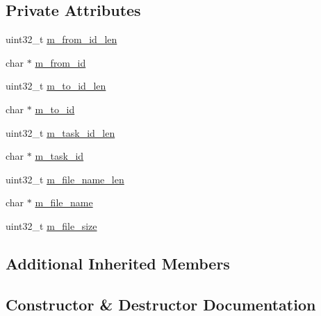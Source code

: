 \subsection*{Private Attributes}
\begin{DoxyCompactItemize}
\item 
uint32\+\_\+t \hyperlink{class_c_im_pdu_client_file_add_offline_req_a3fb49a99c470e955a3ea51f13f66b49b}{m\+\_\+from\+\_\+id\+\_\+len}
\item 
char $\ast$ \hyperlink{class_c_im_pdu_client_file_add_offline_req_a127d10089b9f3daa6bb7eac061203e4f}{m\+\_\+from\+\_\+id}
\item 
uint32\+\_\+t \hyperlink{class_c_im_pdu_client_file_add_offline_req_af9fc05c82fd007252c7ba53ba08a8a94}{m\+\_\+to\+\_\+id\+\_\+len}
\item 
char $\ast$ \hyperlink{class_c_im_pdu_client_file_add_offline_req_a57c210ecfdbfef4eb3912aeef27f31c2}{m\+\_\+to\+\_\+id}
\item 
uint32\+\_\+t \hyperlink{class_c_im_pdu_client_file_add_offline_req_af0b1969ae38d3e156ab37f3050029a6e}{m\+\_\+task\+\_\+id\+\_\+len}
\item 
char $\ast$ \hyperlink{class_c_im_pdu_client_file_add_offline_req_aac27f3f2e26f9f6a0d4aca16ce00c0d7}{m\+\_\+task\+\_\+id}
\item 
uint32\+\_\+t \hyperlink{class_c_im_pdu_client_file_add_offline_req_a1b2c4aa74e652ee1c3e2019fe8c3c663}{m\+\_\+file\+\_\+name\+\_\+len}
\item 
char $\ast$ \hyperlink{class_c_im_pdu_client_file_add_offline_req_ad6b64c1fff2375b861c432c87cead42b}{m\+\_\+file\+\_\+name}
\item 
uint32\+\_\+t \hyperlink{class_c_im_pdu_client_file_add_offline_req_a4ba4dbfefbea61e73f8f8dc268ceffa1}{m\+\_\+file\+\_\+size}
\end{DoxyCompactItemize}
\subsection*{Additional Inherited Members}


\subsection{Constructor \& Destructor Documentation}
\hypertarget{class_c_im_pdu_client_file_add_offline_req_aee8b88b3267020e47638c945085b718a}{}
